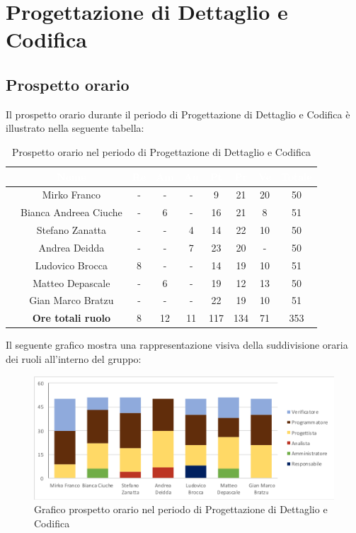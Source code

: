 \section{Progettazione di Dettaglio e Codifica}
\subsection{Prospetto orario}
Il prospetto orario durante il periodo di Progettazione di Dettaglio e Codifica è illustrato nella seguente tabella:

\begin{table}[ht]
	\begin{center}
		\begin{tabular}{ccccccccc}
			\rowcolor{coolblack}
			\hline
			& \textcolor{white}{Nome} & \textcolor{white}{Re} & \textcolor{white}{Am} & \textcolor{white}{An} & \textcolor{white}{Pt} &\textcolor{white}{Pr} & \textcolor{white}{Ve} & \textcolor{white}{Totale} \\
			\hline
			&Mirko Franco & - & - & - & 9 & 21 & 20 & 50  \\
			&Bianca Andreea Ciuche & -& 6& - & 16 & 21 & 8 & 51 \\
			&Stefano Zanatta & - & - & 4 & 14 & 22 & 10 & 50 \\
			&Andrea Deidda &  -& - & 7 & 23 & 20 & - & 50 \\
			&Ludovico Brocca & 8& - & - & 14 & 19 & 10 & 51 \\
			&Matteo Depascale & -& 6& - & 19 & 12 & 13 & 50 \\
			&Gian Marco Bratzu & -& - & - & 22 & 19 & 10 & 51 \\
			\hline
			&\textbf{Ore totali ruolo} & 8 & 12 & 11 & 117 & 134 & 71 & 353 \\
		\end{tabular}
	\caption{Prospetto orario nel periodo di Progettazione di Dettaglio e Codifica}
	\end{center}
\end{table}

Il seguente grafico mostra una rappresentazione visiva della suddivisione oraria dei ruoli all'interno del gruppo:
\begin{figure}[!ht]
	\begin{center}
		\includegraphics[scale=0.80]{images/grafoProgettazioneDettaglioCodifica.png}
		\caption{Grafico prospetto orario nel periodo di Progettazione di Dettaglio e Codifica}
	\end{center}
\end{figure}

